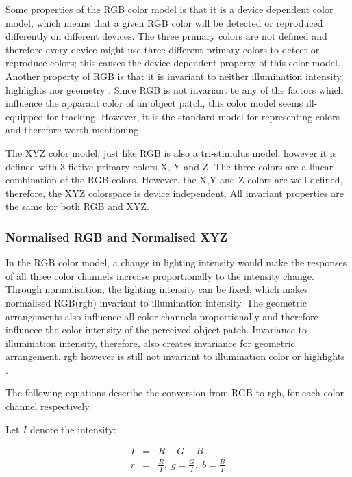 \documentclass[a4paper,11pt]{article}
\begin{document}
Some properties of the RGB color model is that it is a device dependent color model, which means that a given RGB color will be detected or reproduced differently on different devices. The three primary colors are not defined and therefore every device might use three different primary colors to detect or reproduce colors; this causes the device dependent property of this color model. Another property of RGB is that it is invariant to neither illumination intensity, highlights nor geometry \cite{gevers_invariant}. Since RGB is not invariant to any of the factors which influence the apparant color of an object patch, this color model seems ill-equipped for tracking. However, it is the standard model for representing colors and therefore worth mentioning.



The XYZ color model, just like RGB is also a tri-stimulus model, however it is defined  with 3 fictive primary colors X, Y and Z. The three colors are a linear combination of the RGB colors. However, the X,Y and Z colors are well defined, therefore, the XYZ colorspace is device independent. All invariant properties are the same for both RGB and XYZ.



\subsubsection{Normalised RGB and Normalised XYZ}



In the RGB color model, a change in lighting intensity would make the responses of all three color channels increase proportionally to the intensity change. Through normalisation, the lighting intensity can be fixed, which makes normalised RGB(rgb) invariant to illumination intensity. The geometric arrangements also influence all color channels proportionally and therefore influnece the color intensity of the perceived object patch. Invariance to illumination intensity, therefore, also creates invariance for geometric arrangement. rgb however is still not invariant to illumination color or highlights \cite{gevers_invariant}. 



The following equations describe the conversion from RGB to rgb, for each color channel respectively.  

Let $I$ denote the intensity:

\begin{eqnarray}

\label{eq:rgb}

I &=& R+G+B \\

r &=& \frac{R}{I},\; g = \frac{G}{I},\; b = \frac{B}{I}

\end{eqnarray}
\end{document}
